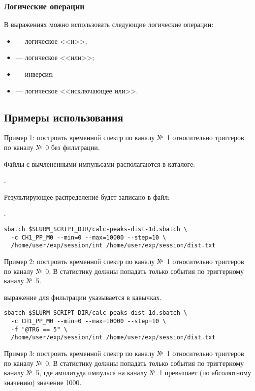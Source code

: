 \subsubsection{Логические операции}

В выражениях можно использовать следующие логические операции:

\begin{itemize}
\item \CMDARG{\&} --- логическое <<и>>;
\item \CMDARG{|} --- логическое <<или>>;
\item \CMDARG{!} --- инверсия;
\item {} --- логическое <<исключающее или>>.
\end{itemize}

\subsection{Примеры использования}

Пример 1: построить временной спектр по каналу №~1 относительно триггеров по каналу №~0 без фильтрации. 

Файлы с вычлененными импульсами располагаются в каталоге:

 . 

Результирующее распределение будет записано в файл:

 .

\begin{lstlisting}
sbatch $SLURM_SCRIPT_DIR/calc-peaks-dist-1d.sbatch \
  -c CH1_PP_M0 --min=0 --max=10000 --step=10 \
  /home/user/exp/session/int /home/user/exp/session/dist.txt
\end{lstlisting}

\bigskip
Пример 2: построить временной спектр по каналу №~1 относительно триггеров по каналу №~0. В статистику должны попадать только события по триггерному каналу №~5.

\NOTE{} выражение для фильтрации указывается в кавычках.

\begin{lstlisting}
sbatch $SLURM_SCRIPT_DIR/calc-peaks-dist-1d.sbatch \
  -c CH1_PP_M0 --min=0 --max=10000 --step=10 \
  -f "@TRG == 5" \
  /home/user/exp/session/int /home/user/exp/session/dist.txt
\end{lstlisting}

\bigskip
Пример 3: построить временной спектр по каналу №~1 относительно триггеров по каналу №~0. В статистику должны попадать только события по триггерному каналу №~5, где амплитуда импульса на каналу №~1 превышает (по абсолютному значению) значение 1000.

